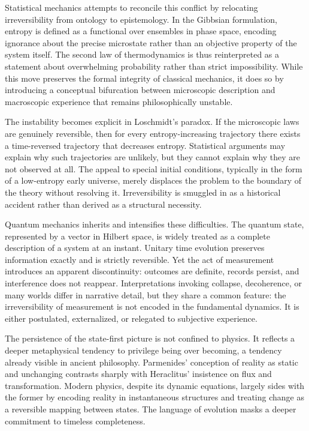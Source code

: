 \documentclass[11pt,oneside]{book}
\begin{document}
Statistical mechanics attempts to reconcile this conflict by relocating irreversibility from ontology to epistemology. In the Gibbsian formulation, entropy is defined as a functional over ensembles in phase space, encoding ignorance about the precise microstate rather than an objective property of the system itself. The second law of thermodynamics is thus reinterpreted as a statement about overwhelming probability rather than strict impossibility. While this move preserves the formal integrity of classical mechanics, it does so by introducing a conceptual bifurcation between microscopic description and macroscopic experience that remains philosophically unstable.

The instability becomes explicit in Loschmidt’s paradox. If the microscopic laws are genuinely reversible, then for every entropy-increasing trajectory there exists a time-reversed trajectory that decreases entropy. Statistical arguments may explain why such trajectories are unlikely, but they cannot explain why they are not observed at all. The appeal to special initial conditions, typically in the form of a low-entropy early universe, merely displaces the problem to the boundary of the theory without resolving it. Irreversibility is smuggled in as a historical accident rather than derived as a structural necessity.

Quantum mechanics inherits and intensifies these difficulties. The quantum state, represented by a vector in Hilbert space, is widely treated as a complete description of a system at an instant. Unitary time evolution preserves information exactly and is strictly reversible. Yet the act of measurement introduces an apparent discontinuity: outcomes are definite, records persist, and interference does not reappear. Interpretations invoking collapse, decoherence, or many worlds differ in narrative detail, but they share a common feature: the irreversibility of measurement is not encoded in the fundamental dynamics. It is either postulated, externalized, or relegated to subjective experience.

The persistence of the state-first picture is not confined to physics. It reflects a deeper metaphysical tendency to privilege being over becoming, a tendency already visible in ancient philosophy. Parmenides’ conception of reality as static and unchanging contrasts sharply with Heraclitus’ insistence on flux and transformation. Modern physics, despite its dynamic equations, largely sides with the former by encoding reality in instantaneous structures and treating change as a reversible mapping between states. The language of evolution masks a deeper commitment to timeless completeness.
\end{document}
